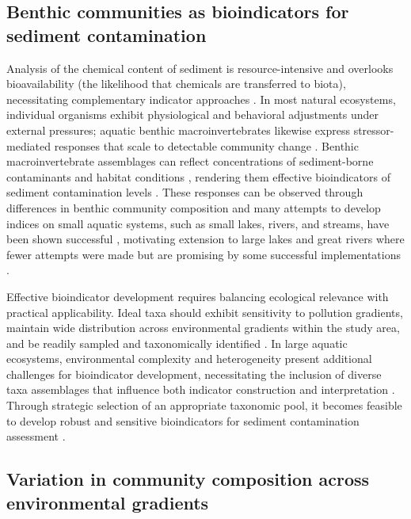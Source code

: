\subsection{Benthic communities as bioindicators for sediment contamination}
Analysis of the chemical content of sediment is resource-intensive and overlooks bioavailability
(the likelihood that chemicals are transferred to biota),
necessitating complementary indicator approaches \cite{Chapman1990SedimentTriad}.
In most natural ecosystems, individual organisms exhibit physiological and behavioral adjustments under external pressures; 
aquatic benthic macroinvertebrates likewise express stressor-mediated responses that scale to detectable community change \cite{Holling1973}.
Benthic macroinvertebrate assemblages can reflect concentrations of sediment-borne contaminants and habitat conditions \cite{Tampo2021Bioindicators},
rendering them effective bioindicators of sediment contamination levels \cite{Desrosiers2020}.
These responses can be observed through differences in benthic community composition and many attempts to develop indices on small aquatic systems, 
such as small lakes, rivers, and streams, have been shown successful \cite{Cain1992Bioindicators, Archaimbault2010SedimentStreams},
motivating extension to large lakes and great rivers where fewer attempts were made but are promising
 by some successful implementations \cite{Birk2012Methods,Ciborowski2005ZoobenthicIndicators, Reynoldson1995}.

Effective bioindicator development requires balancing ecological relevance with practical applicability.
Ideal taxa should exhibit sensitivity to pollution gradients, maintain wide distribution across environmental gradients within the study area,
and be readily sampled and taxonomically identified \cite{LenatResh2001Taxonomy}.
In large aquatic ecosystems, environmental complexity and heterogeneity present additional challenges for bioindicator development,
necessitating the inclusion of diverse taxa assemblages that influence both indicator construction and interpretation \cite{Menezes2010Trait, Bonada2006BiomonitoringReview}.
Through strategic selection of an appropriate taxonomic pool, it becomes feasible to develop robust and sensitive bioindicators 
for sediment contamination assessment \cite{LenatResh2001Taxonomy}.


\subsection{Variation in community composition across environmental gradients}


